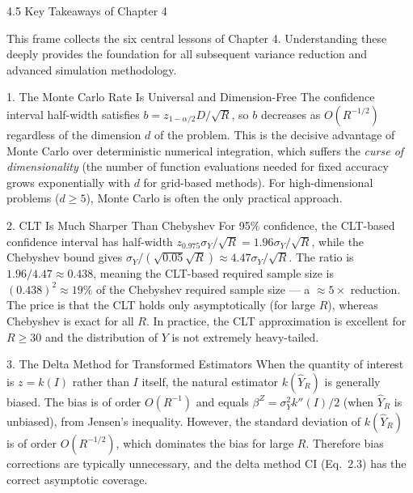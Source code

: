 \documentclass[aspectratio=169,10pt]{beamer}
\begin{document}
\begin{frame}[allowframebreaks]{4.5 Key Takeaways of Chapter 4}

This frame collects the six central lessons of Chapter 4.  Understanding these
deeply provides the foundation for all subsequent variance reduction and advanced
simulation methodology.

\begin{alertblock}{1. The Monte Carlo Rate Is Universal and Dimension-Free}
  The confidence interval half-width satisfies $b = z_{1-\alpha/2} D/\sqrt{R}$,
  so $b$ decreases as $O(R^{-1/2})$ regardless of the dimension $d$ of the
  problem.  This is the decisive advantage of Monte Carlo over deterministic
  numerical integration, which suffers the \emph{curse of dimensionality} (the
  number of function evaluations needed for fixed accuracy grows exponentially
  with $d$ for grid-based methods).  For high-dimensional problems ($d \geq 5$),
  Monte Carlo is often the only practical approach.
\end{alertblock}

\begin{alertblock}{2. CLT Is Much Sharper Than Chebyshev}
  For 95\% confidence, the CLT-based confidence interval has half-width
  $z_{0.975}\sigma_Y/\sqrt{R} = 1.96\sigma_Y/\sqrt{R}$, while the Chebyshev bound
  gives $\sigma_Y/(\sqrt{0.05}\sqrt{R}) \approx 4.47\sigma_Y/\sqrt{R}$.
  The ratio is $1.96/4.47 \approx 0.438$, meaning the CLT-based required sample
  size is $(0.438)^2 \approx 19\%$ of the Chebyshev required sample size ---
  a $\approx 5\times$ reduction.  The price is that the CLT holds only
  asymptotically (for large $R$), whereas Chebyshev is exact for all $R$.
  In practice, the CLT approximation is excellent for $R \geq 30$ and the
  distribution of $Y$ is not extremely heavy-tailed.
\end{alertblock}

\framebreak

\begin{alertblock}{3. The Delta Method for Transformed Estimators}
  When the quantity of interest is $z = k(I)$ rather than $I$ itself, the
  natural estimator $k(\hat{Y}_R)$ is generally biased.  The bias is of order
  $O(R^{-1})$ and equals $\beta^Z = \sigma_Y^2 k''(I)/2$ (when $\hat{Y}_R$ is
  unbiased), from Jensen's inequality.  However, the standard deviation of
  $k(\hat{Y}_R)$ is of order $O(R^{-1/2})$, which dominates the bias for large
  $R$.  Therefore bias corrections are typically unnecessary, and the delta method
  CI (Eq.\ 2.3) has the correct asymptotic coverage.


\end{alertblock}
\end{frame}
\end{document}
